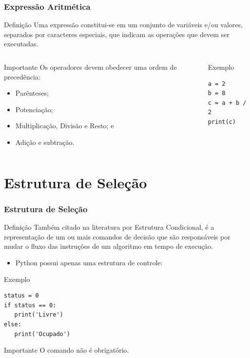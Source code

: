 \documentclass{beamer}
\begin{document}
\begin{frame}[fragile]
\frametitle{Expressão Aritmética}

\begin{block}{Definição}
Uma expressão constitui-se em um conjunto de variáveis e/ou valores, separados por caracteres especiais, que indicam as operações que devem ser executadas.
\end{block} \vfill

 \begin{columns}[c]

\begin{alertblock}{Importante}
Os operadores devem obedecer uma ordem de precedência:
\begin{itemize}
	\item Parênteses;
	\item Potenciação;
	\item Multiplicação, Divisão e Resto; e
	\item Adição e subtração.
\end{itemize}
\end{alertblock} \vfill

\begin{exampleblock}{Exemplo}
	\begin{lstlisting}
a = 2
b = 8
c = a + b / 2
print(c)
	\end{lstlisting}
\end{exampleblock}
\end{columns}
\end{frame}

\section{Estrutura de Seleção}

\begin{frame}[fragile]
\frametitle{Estrutura de Seleção}

\begin{block}{Definição}
Também citado na literatura por Estrutura Condicional, é a
representação de um ou mais comandos de decisão que são responsáveis por mudar o fluxo das instruções de um algoritmo em tempo de execução.
\end{block} \vfill

\begin{itemize}
	\item Python possui apenas uma estrutura de controle: 
\end{itemize}

\begin{exampleblock}{Exemplo}
	\begin{lstlisting}
status = 0
if status == 0:
   print('Livre')
else:
   print('Ocupado')
\end{lstlisting}
\end{exampleblock}\vfill

\begin{alertblock}{Importante}
O comando  não é obrigatório.
\end{alertblock}
\end{frame}
\end{document}
